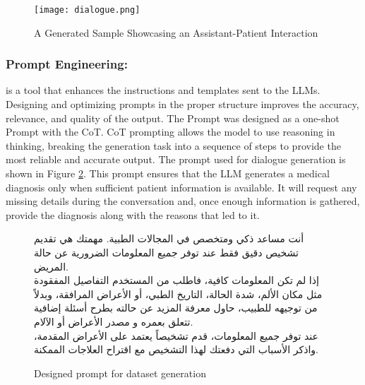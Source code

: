 \documentclass[manuscript,screen,review]{acmart}
\begin{document}
 \FloatBarrier
\begin{figure}[htbp]
    \centering
    \texttt{[image: dialogue.png]} 
    \caption{A Generated Sample Showcasing an Assistant-Patient Interaction}
    \label{fig:dialogue}
\end{figure}
\FloatBarrier

\subsubsection{\textbf{Prompt Engineering:}} is a tool that enhances the instructions and templates sent to the LLMs. Designing and optimizing prompts in the proper structure improves the accuracy, relevance, and quality of the output. The Prompt was designed as a one-shot Prompt with the CoT. 
CoT prompting allows the model to use reasoning in thinking, breaking the generation task into a sequence of steps to provide the most reliable and accurate output. The prompt used for dialogue generation is shown in Figure \ref{prompt:M_prompt}. This prompt ensures that the LLM generates a medical diagnosis only when sufficient patient information is available. It will request any missing details during the conversation and, once enough information is gathered, provide the diagnosis along with the reasons that led to it.

\begin{figure}[ht]
\centering
\begin{tcolorbox}[
  colback=black!5!white,
  colframe=black,
  fonttitle=\bfseries,
  title=Prompt,
  arc=5pt,
  boxrule=0.8pt,
  fontupper=\small, %
  width=\textwidth,
]
\begin{otherlanguage}{arabic}
أنت مساعد ذكي ومتخصص في المجالات الطبية. مهمتك هي تقديم تشخيص دقيق فقط عند توفر جميع المعلومات 
الضرورية عن حالة المريض. \\
إذا لم تكن المعلومات كافية، فاطلب من المستخدم التفاصيل المفقودة مثل مكان الألم، شدة الحالة، 
التاريخ الطبي، أو الأعراض المرافقة، وبدلاً من توجيهه للطبيب، حاول معرفة المزيد عن حالته بطرح أسئلة 
إضافية تتعلق بعمره و مصدر الأعراض أو الآلام. \\
عند توفر جميع المعلومات، قدم تشخيصاً يعتمد على الأعراض المقدمة، واذكر الأسباب التي دفعتك لهذا التشخيص 
مع اقتراح العلاجات الممكنة.
\end{otherlanguage}
\end{tcolorbox}
\caption{Designed prompt for dataset generation}
\label{prompt:M_prompt}
\end{figure}
\end{document}

